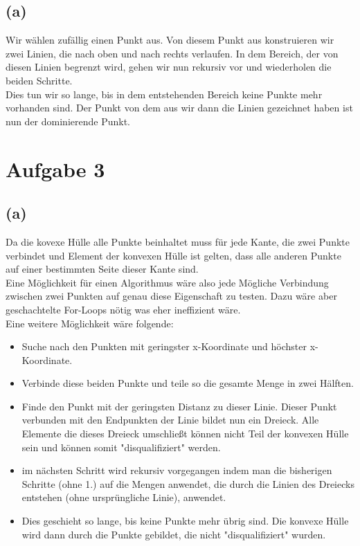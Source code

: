 \documentclass[a4paper]{scrartcl}
\newcounter{punkte}
\begin{document}
\subsection*{(a)} %
Wir wählen zufällig einen Punkt aus. Von diesem Punkt aus konstruieren wir zwei Linien, die nach oben und nach rechts verlaufen. In dem Bereich, der von diesen Linien begrenzt wird, gehen wir nun rekursiv vor und wiederholen die beiden Schritte.\\
Dies tun wir so lange, bis in dem entstehenden Bereich keine Punkte mehr vorhanden sind. Der Punkt von dem aus wir dann die Linien gezeichnet haben ist nun der dominierende Punkt.











\section*{Aufgabe 3}

\subsection*{(a)}
Da die kovexe Hülle alle Punkte beinhaltet muss für jede Kante, die zwei Punkte verbindet und Element der konvexen Hülle ist gelten, dass alle anderen Punkte auf einer bestimmten Seite dieser Kante sind.\\
Eine Möglichkeit für einen Algorithmus wäre also jede Mögliche Verbindung zwischen zwei Punkten auf genau diese Eigenschaft zu testen. Dazu wäre aber geschachtelte For-Loops nötig was eher ineffizient wäre.\\
Eine weitere Möglichkeit wäre folgende:\\
\begin{itemize}
	\item Suche nach den Punkten mit geringster x-Koordinate und höchster x-Koordinate.
	\item Verbinde diese beiden Punkte und teile so die gesamte Menge in zwei Hälften.
	\item Finde den Punkt mit der geringsten Distanz zu dieser Linie. Dieser Punkt verbunden mit den Endpunkten der Linie bildet nun ein Dreieck. Alle Elemente die dieses Dreieck umschließt können nicht Teil der konvexen Hülle sein und können somit "disqualifiziert" werden.
	\item im nächsten Schritt wird rekursiv vorgegangen indem man die bisherigen Schritte (ohne 1.) auf die Mengen anwendet, die durch die Linien des Dreiecks entstehen (ohne ursprüngliche Linie), anwendet.
	\item Dies geschieht so lange, bis keine Punkte mehr übrig sind. Die konvexe Hülle wird dann durch die Punkte gebildet, die nicht "disqualifiziert" wurden.
\end{itemize}
\end{document}
